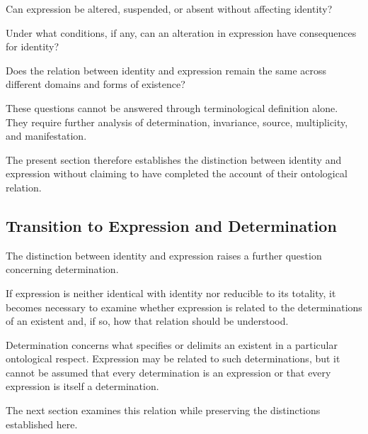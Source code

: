 Can expression be altered, suspended, or absent
without affecting identity?

Under what conditions, if any, can an alteration
in expression have consequences for identity?

Does the relation between identity and expression
remain the same across different domains and
forms of existence?

These questions cannot be answered through
terminological definition alone. They require
further analysis of determination, invariance,
source, multiplicity, and manifestation.

The present section therefore establishes the
distinction between identity and expression
without claiming to have completed the account
of their ontological relation.

\subsection{Transition to Expression and Determination}

The distinction between identity and expression
raises a further question concerning determination.

If expression is neither identical with identity
nor reducible to its totality, it becomes necessary
to examine whether expression is related to the
determinations of an existent and, if so, how
that relation should be understood.

Determination concerns what specifies or delimits
an existent in a particular ontological respect.
Expression may be related to such determinations,
but it cannot be assumed that every determination
is an expression or that every expression is
itself a determination.

The next section examines this relation while
preserving the distinctions established here.

